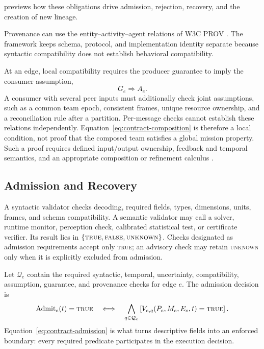  previews how these obligations drive admission,
rejection, recovery, and the creation of new lineage.



Provenance can use the entity--activity--agent relations of W3C PROV
\cite{w3c2013prov}.  The framework keeps schema, protocol, and implementation
identity separate because syntactic compatibility does not establish behavioral
compatibility.

At an edge, local compatibility requires the producer guarantee to imply the
consumer assumption,
\begin{equation}
  G_e\Longrightarrow A_e.
  \label{eq:contract-composition}
\end{equation}
A consumer with several peer inputs must additionally check joint assumptions,
such as a common team epoch, consistent frames, unique resource ownership, and a
reconciliation rule after a partition.  Per-message checks cannot establish
these relations independently.  Equation~\eqref{eq:contract-composition} is
therefore a local condition, not proof that the composed team satisfies a global
mission property.  Such a proof requires defined input/output ownership,
feedback and temporal semantics, and an appropriate composition or refinement
calculus \cite{luckcuck2026compositional,mallozzi2022repair}.

\subsection{Admission and Recovery}

A syntactic validator checks decoding, required fields, types, dimensions,
units, frames, and schema compatibility.  A semantic validator may call a
solver, runtime monitor, perception check, calibrated statistical test, or
certificate verifier.  Its result lies in
$\{\textsc{true},\textsc{false},\textsc{unknown}\}$.  Checks designated as
admission requirements accept only \textsc{true}; an advisory check may retain
\textsc{unknown} only when it is explicitly excluded from admission.

Let $\mathcal Q_e$ contain the required syntactic, temporal, uncertainty,
compatibility, assumption, guarantee, and provenance checks for edge $e$.  The
admission decision is
\begin{equation}
  \operatorname{Admit}_e(t)=\textsc{true}
  \quad\Longleftrightarrow\quad
  \bigwedge_{q\in\mathcal Q_e}
  \left[V_{e,q}(P_e,M_e,E_e,t)=\textsc{true}\right].
  \label{eq:contract-admission}
\end{equation}
Equation~\eqref{eq:contract-admission} is what turns descriptive fields into an
enforced boundary: every required predicate participates in the execution
decision.

